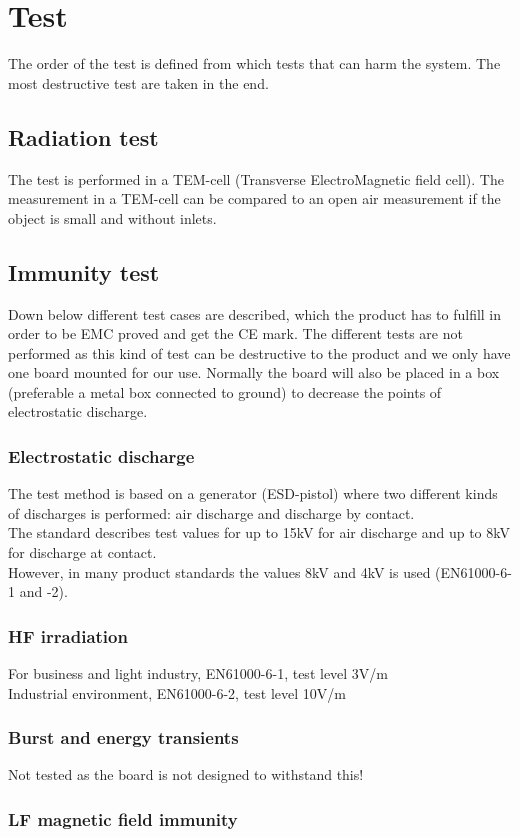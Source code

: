 \chapter{Test}
The order of the test is defined from which tests that can harm the system. The most destructive test are taken in the end. 
\section{Radiation test}
The test is performed in a TEM-cell (Transverse ElectroMagnetic field cell).
The measurement in a TEM-cell can be compared to an open air measurement if the object is small and without inlets. 


\section{Immunity test}
Down below different test cases are described, which the product has to fulfill in order to be EMC proved and get the CE mark. The different tests are not performed as this kind of test can be destructive to the product and we only have one board mounted for our use. Normally the board will also be placed in a box (preferable a metal box connected to ground) to decrease the points of electrostatic discharge. 
\subsection{Electrostatic discharge}
The test method is based on a generator (ESD-pistol) where two different kinds of discharges is performed: air discharge and discharge by contact. 
\\ The standard describes test values for up to 15kV for air discharge and up to 8kV for discharge at contact.
\\ However, in many product standards the values 8kV and 4kV is used (EN61000-6-1 and -2).

\subsection{HF irradiation}
For business and light industry, EN61000-6-1, test level 3V/m
\\ Industrial environment, EN61000-6-2, test level 10V/m

\subsection{Burst and energy transients}
Not tested as the board is not designed to withstand this!

\subsection{LF magnetic field immunity}


